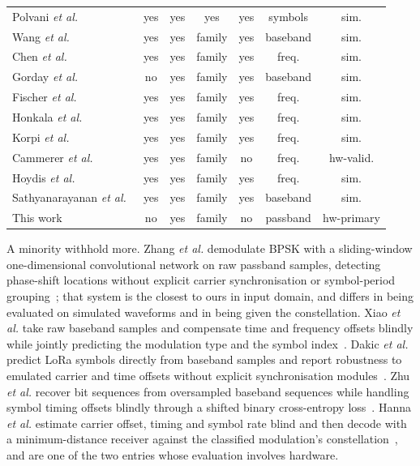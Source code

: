 \documentclass[journal]{IEEEtran}   %
\begin{document}
\begin{table}[!t]
\begin{tabular}{lcccccc}
Polvani \textit{et al.}~\cite{polvani2021MIMO} & yes & yes & yes & yes & symbols & sim. \\
Wang \textit{et al.}~\cite{wang2024optimalSequence} & yes & yes & family & yes & baseband & sim. \\
Chen \textit{et al.}~\cite{chen2024robustSymboldetection} & yes & yes & family & yes & freq. & sim. \\
Gorday \textit{et al.}~\cite{gorday2020complexNN} & no & yes & family & yes & baseband & sim. \\
Fischer \textit{et al.}~\cite{fischer2022OFDM} & yes & yes & family & yes & freq. & sim. \\
Honkala \textit{et al.}~\cite{honkala2021deeprxfullyconvolutionaldeep} & yes & yes & family & yes & freq. & sim. \\
Korpi \textit{et al.}~\cite{korpi2021UplinkCNN} & yes & yes & family & yes & freq. & sim. \\
Cammerer \textit{et al.}~\cite{cammerer2020trainableCS} & yes & yes & family & no & freq. & hw-valid. \\
Hoydis \textit{et al.}~\cite{hoydis2021nativeAirInterface} & yes & yes & family & yes & freq. & sim. \\
Sathyanarayanan \textit{et al.}~\cite{satyanarayan2023RML} & yes & yes & family & yes & baseband & sim. \\
\addlinespace
This work & no & yes & family & no & passband & hw-primary \\
\bottomrule
\end{tabular}
\end{table}

A minority withhold more. Zhang \textit{et al.} demodulate BPSK with a
sliding-window one-dimensional convolutional network on raw passband samples,
detecting phase-shift locations without explicit carrier synchronisation or
symbol-period grouping~\cite{Zhang2018Enhanced}; that system is the closest to
ours in input domain, and differs in being evaluated on simulated waveforms and
in being given the constellation. Xiao \textit{et al.} take raw baseband samples
and compensate time and frequency offsets blindly while jointly predicting the
modulation type and the symbol index~\cite{Xiao2023_UnifiedDeep}. Dakic
\textit{et al.} predict LoRa symbols directly from baseband samples and report
robustness to emulated carrier and time offsets without explicit synchronisation
modules~\cite{dakic2021LoRa}. Zhu \textit{et al.} recover bit sequences from
oversampled baseband sequences while handling symbol timing offsets blindly
through a shifted binary cross-entropy loss~\cite{Zhu2022EndtoEnd}. Hanna
\textit{et al.} estimate carrier offset, timing and symbol rate blind and then
decode with a minimum-distance receiver against the classified modulation's
constellation~\cite{Hanna2022SignalProcessing}, and are one of the two entries
whose evaluation involves hardware.
\end{document}
